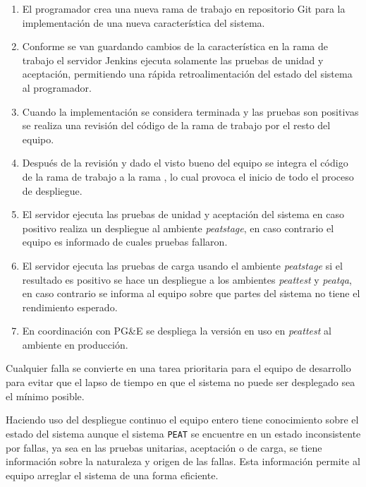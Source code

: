 \begin{enumerate}
\item El programador crea una nueva rama de trabajo en repositorio Git para la
  implementación de una nueva característica del sistema.
\item Conforme se van guardando cambios de la característica en la rama de trabajo
  el servidor Jenkins ejecuta solamente las pruebas de unidad y aceptación,
  permitiendo una rápida retroalimentación del estado del sistema al programador.
\item Cuando la implementación se considera terminada y las pruebas son positivas
  se realiza una revisión del código de la rama de trabajo por el resto del
  equipo.
\item Después de la revisión y dado el visto bueno del equipo se integra el
  código de la rama de trabajo a la rama , lo cual provoca el
  inicio de todo el proceso de despliegue.
\item El servidor ejecuta las pruebas de unidad y aceptación del sistema en
  caso positivo realiza un despliegue al ambiente \textit{peatstage}, en caso
  contrario el equipo es informado de cuales pruebas fallaron.
\item El servidor ejecuta las pruebas de carga usando el ambiente \textit{peatstage}
  si el resultado es positivo se hace un despliegue a los ambientes \textit{peattest}
  y \textit{peatqa}, en caso contrario se informa al equipo sobre que partes del
  sistema no tiene el rendimiento esperado.
\item En coordinación con PG\&E se despliega la versión en uso en \textit{peattest}
  al ambiente en producción.
\end{enumerate}

Cualquier falla se convierte en una tarea prioritaria para el equipo de desarrollo
para evitar que el lapso de tiempo en que el sistema no puede ser desplegado sea
el mínimo posible.

Haciendo uso del despliegue continuo el equipo entero tiene conocimiento sobre el
estado del sistema aunque el sistema \texttt{PEAT} se encuentre en un estado
inconsistente por fallas, ya sea en las pruebas unitarias, aceptación o de carga,
se tiene información sobre la naturaleza y origen de las fallas. Esta información
permite al equipo arreglar el sistema de una forma eficiente.

